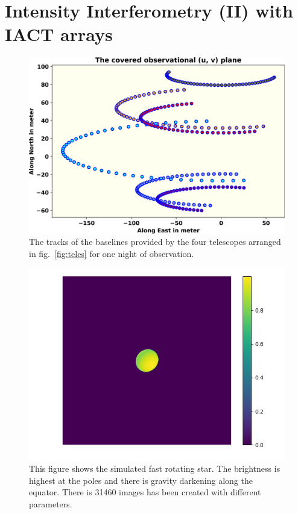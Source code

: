 \section{Intensity Interferometry (II) with IACT arrays}
\begin{figure}
  \includegraphics[width=\linewidth]{fig/baseline.png}
  \caption{The tracks of the baselines provided by the four telescopes arranged in fig.~\ref{fig:teles} for one night of observation.}
  \label{fig:base}
\end{figure}
\begin{figure}[hbt]
  \includegraphics[width=\linewidth]{fig/ellipse/ellipse1612.png}
  \caption{This figure shows the simulated fast rotating star. The brightness is highest at the poles and there is gravity darkening along the equator. There is 31460 images has been created with different parameters.}
  \label{fig:image}
\end{figure}

